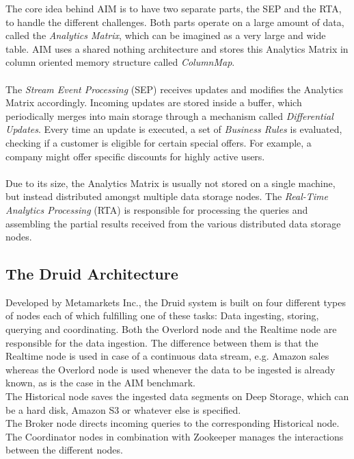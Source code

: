 \documentclass[11pt,singlecolumn]{scrartcl}
\begin{document}
The core idea behind AIM is to have two separate parts, the SEP and the RTA, to handle the different challenges.  Both parts operate on a large amount of data, called the \textit{Analytics Matrix}, which can be imagined as a very large and wide table. AIM uses a shared nothing architecture and stores this Analytics Matrix in column oriented memory structure called \textit{ColumnMap}.\\\\The \textit{Stream Event Processing} (SEP)  receives updates and modifies the Analytics Matrix accordingly. Incoming updates are stored inside a buffer, which periodically merges into main storage through a mechanism called \textit{Differential Updates}. Every time an update is executed, a set of \textit{Business Rules} is evaluated, checking if a customer is eligible for certain special offers. For example, a company might offer specific discounts for highly active users.\\\\ Due to its size, the Analytics Matrix is usually not stored on a single machine, but instead distributed amongst multiple data storage nodes. The \textit{Real-Time Analytics Processing} (RTA) is responsible for processing the queries and assembling the partial results received from the various distributed data storage nodes.

\clearpage

\subsection{The Druid Architecture}
Developed by Metamarkets Inc., the Druid system \cite{druid} is built on four different types of nodes each of which fulfilling one of these tasks: Data ingesting, storing, querying and coordinating. Both the Overlord node and the Realtime node are responsible for the data ingestion. The difference between them is that the Realtime node is used in case of a continuous data stream, e.g. Amazon sales whereas the Overlord node is used whenever the data to be ingested is already known, as is the case in the AIM benchmark.\\
The Historical node saves the ingested data segments on Deep Storage, which can be a hard disk, Amazon S3 or whatever else is specified.\\
The Broker node directs incoming queries to the corresponding Historical node.\\
The Coordinator nodes in combination with Zookeeper \cite{zoo} manages the interactions between the different nodes.\\
\end{document}
